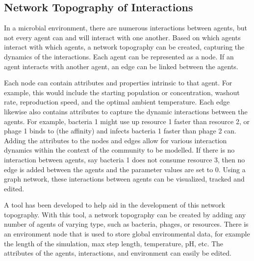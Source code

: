 \subsection{Network Topography of Interactions}
In a microbial environment, there are numerous interactions between agents, but not every agent can and will interact with one another.
Based on which agents interact with which agents, a network topography can be created, capturing the dynamics of the interactions.
Each agent can be represented as a node.
If an agent interacts with another agent, an edge can be linked between the agents.

Each node can contain attributes and properties intrinsic to that agent. 
For example, this would include the starting population or concentration, washout rate, reproduction speed, and the optimal ambient temperature. 
Each edge likewise also contains attributes to capture the dynamic interactions between the agents. 
For example, bacteria 1 might use up resource 1 faster than resource 2, or phage 1 binds to (the affinity) and infects bacteria 1 faster than phage 2 can. 
Adding the attributes to the nodes and edges allow for various interaction dynamics within the context of the community to be modelled. 
If there is no interaction between agents, say bacteria 1 does not consume resource 3, then no edge is added between the agents and the parameter values are set to 0. 
Using a graph network, these interactions between agents can be visualized, tracked and edited. \newline 

A tool has been developed to help aid in the development of this network topography.
With this tool, a network topography can be created by adding any number of agents of varying type, such as bacteria, phages, or resources.
There is an environment node that is used to store global environmental data, for example the length of the simulation, max step length, temperature, pH, etc.
The attributes of the agents, interactions, and environment can easily be edited. \newline 

